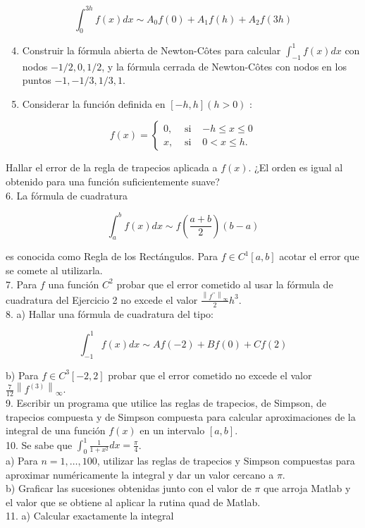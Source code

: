 \documentclass[10pt]{article}
\begin{document}
$$
\int_{0}^{3 h} f(x) d x \sim A_{0} f(0)+A_{1} f(h)+A_{2} f(3 h)
$$

\begin{enumerate}
  \setcounter{enumi}{3}
  \item Construir la fórmula abierta de Newton-Côtes para calcular $\int_{-1}^{1} f(x) d x$ con nodos $-1 / 2,0,1 / 2$, y la fórmula cerrada de Newton-Côtes con nodos en los puntos $-1,-1 / 3,1 / 3,1$.
  \item Considerar la función definida en $[-h, h](h>0)$ :
\end{enumerate}

$$
f(x)=\left\{\begin{array}{ccc}
0, & \text { si } & -h \leq x \leq 0 \\
x, & \text { si } & 0<x \leq h .
\end{array}\right.
$$

Hallar el error de la regla de trapecios aplicada a $f(x)$. ¿El orden es igual al obtenido para una función suficientemente suave?\\
6. La fórmula de cuadratura

$$
\int_{a}^{b} f(x) d x \sim f\left(\frac{a+b}{2}\right)(b-a)
$$

es conocida como Regla de los Rectángulos. Para $f \in C^{1}[a, b]$ acotar el error que se comete al utilizarla.\\
7. Para $f$ una función $C^{2}$ probar que el error cometido al usar la fórmula de cuadratura del Ejercicio 2 no excede el valor $\frac{\left\|f^{\prime \prime}\right\|_{\infty}}{2} h^{3}$.\\
8. a) Hallar una fórmula de cuadratura del tipo:

$$
\int_{-1}^{1} f(x) d x \sim A f(-2)+B f(0)+C f(2)
$$

b) Para $f \in C^{3}[-2,2]$ probar que el error cometido no excede el valor $\frac{7}{12}\left\|f^{(3)}\right\|_{\infty}$.\\
9. Escribir un programa que utilice las reglas de trapecios, de Simpson, de trapecios compuesta y de Simpson compuesta para calcular aproximaciones de la integral de una función $f(x)$ en un intervalo $[a, b]$.\\
10. Se sabe que $\int_{0}^{1} \frac{1}{1+x^{2}} d x=\frac{\pi}{4}$.\\
a) Para $n=1, \ldots, 100$, utilizar las reglas de trapecios y Simpson compuestas para aproximar numéricamente la integral y dar un valor cercano a $\pi$.\\
b) Graficar las sucesiones obtenidas junto con el valor de $\pi$ que arroja Matlab y el valor que se obtiene al aplicar la rutina quad de Matlab.\\
11. a) Calcular exactamente la integral
\end{document}
